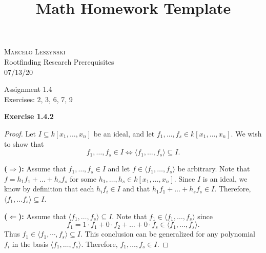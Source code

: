 \documentclass[12pt,oneside]{article}
\newenvironment{exercise}[1]{\vspace{.1in}\noindent\textbf{Exercise #1 \hspace{.05em}}}{}
\begin{document}
\title{Math Homework Template}

\begin{flushright}
\textsc{Marcelo Leszynski}  \\
Rootfinding Research Prerequisites\\
07/13/20
\end{flushright}

\begin{center}
\textsf{Assignment 1.4 } \\
\textsf{Exercises: 2, 3, 6, 7, 9 }
\end{center}


\begin{exercise}{1.4.2}

    \begin{proof}
        Let $I \subseteq k[x_1,\ldots,x_n]$ be an ideal, and let $f_1,
        \ldots, f_s \in k[x_1,\ldots,x_n]$. We wish to show that 
        \[
            f_1,\ldots,f_s \in I \Leftrightarrow \langle f_1,\ldots,f_s\rangle \subseteq I.
        \]

        \bigskip
        \textbf{($\Rightarrow$):} Assume that $f_1,\ldots,f_s \in I$ and let 
        $f \in \langle f_1, \ldots, f_s \rangle$ be arbitrary. Note that 
        $f = h_1f_1 + \ldots + h_sf_s$ for some $h_1,\ldots,h_s \in k[x_1,\ldots,x_n]$.
        Since $I$ is an ideal, we know by definition that each $h_if_i \in I$ and 
        that $h_1f_1 + \ldots + h_sf_s \in I$. Therefore, $\langle f_1, \ldots f_s \rangle \subseteq I$.

        \bigskip
        \textbf{($\Leftarrow$):} Assume that $\langle f_1,\ldots,f_s\rangle \subseteq I$.
        Note that $f_1 \in \langle f_1,\ldots,f_s \rangle$ since 
        \[
            f_1 = 1 \cdot f_1 + 0 \cdot f_2 + \ldots + 0 \cdot f_s \in \langle f_1, \ldots, f_s \rangle.
        \]
        Thus $f_1 \in \langle f_1, \cdots, f_s \rangle \subseteq I$. This conclusion
        can be generalized for any polynomial $f_i$ in the basis $\langle f_1,\ldots,f_s \rangle$.
        Therefore, $f_1,\ldots,f_s \in I$.
    \end{proof}

\end{exercise}

\end{document}
